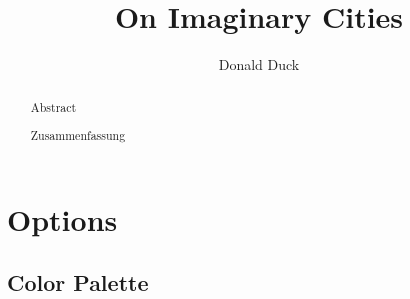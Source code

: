 \documentclass{swsthesis}
\title{On Imaginary Cities}
\author{Donald Duck}
\begin{document}
	\frontmatter
	\maketitle
	\tableofcontents
	\clearpage
	
	\begin{abstract}{Abstract}
		\blindtext
	\end{abstract}
	
	\begin{abstract}{Zusammenfassung}
		\blindtext
	\end{abstract}
	
	\begin{acknowledgements}
		\blindtext
	\end{acknowledgements}
	
	\clearpage
	\listoffigures
	\clearpage
	
	\listoftables
	\clearpage
		
	\mainmatter
	\chapter{Options}
	
	\section{Color Palette}
\end{document}
